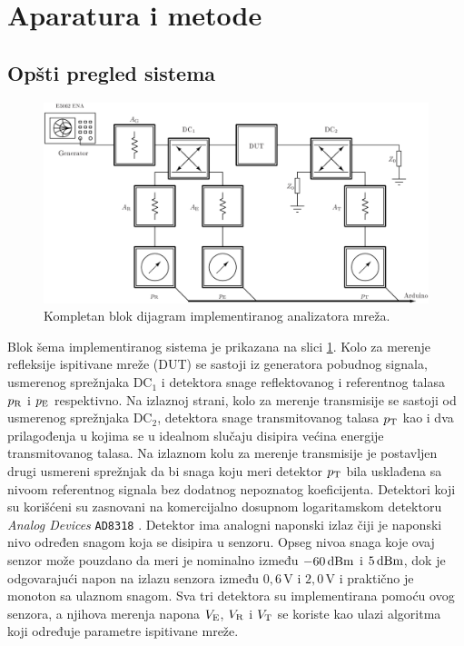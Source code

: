 \documentclass[a4paper, 12pt, diplomski]{etf}
\renewcommand{\unit}[1]{\,{\rm #1}}   %
\begin{document}
\newpage
\section{Aparatura i metode
}
\subsection{Opšti pregled sistema}
%
\begin{figure}[b!]
    \centering
    \includegraphics[width=\textwidth]{fig/sna_block.pdf}
    \caption{Kompletan blok dijagram implementiranog 
    analizatora mreža.}
    \label{fig:sna_complete}
\end{figure}
%
Blok šema implementiranog sistema je prikazana na slici \ref{fig:sna_complete}. 
Kolo za merenje refleksije ispitivane mreže 
(DUT)
se sastoji iz generatora pobudnog signala, usmerenog sprežnjaka DC$_1$ 
i detektora snage 
reflektovanog i referentnog talasa $p_{\rm R}$ 
i $p_{\rm E}$ respektivno. 
Na izlaznoj strani, kolo za merenje transmisije se sastoji 
od usmerenog sprežnjaka DC$_2$, 
detektora snage transmitovanog talasa $p_{\rm T}$ kao i dva prilagođenja u kojima se u idealnom slučaju disipira
 većina energije transmitovanog talasa. Na izlaznom kolu za merenje transmisije je postavljen drugi usmereni sprežnjak da bi 
 snaga koju meri detektor $p_{\rm T}$ bila usklađena sa nivoom 
 referentnog signala bez dodatnog nepoznatog koeficijenta. 
%
Detektori
 koji su korišćeni su zasnovani na komercijalno dosupnom logaritamskom detektoru
 \textit{Analog Devices}
 {\tt AD8318} \cite{ad8318}. Detektor ima analogni naponski izlaz čiji je naponski 
 nivo određen snagom koja se disipira u senzoru. Opseg
 nivoa snaga koje ovaj senzor može 
 pouzdano da meri je nominalno između $-60{\rm\,dBm}$ i $5{\rm\,dBm}$, dok je odgovarajući napon
 na izlazu senzora između $0,6\,$V i $2,0\,$V i praktično je monoton sa ulaznom snagom.
 Sva tri detektora su implementirana pomoću ovog senzora, a njihova merenja napona
 $V_{\rm E}$, $V_{\rm R}$ i $V_{\rm T}$ se koriste kao ulazi algoritma koji određuje 
 parametre ispitivane mreže. 
%
\end{document}
